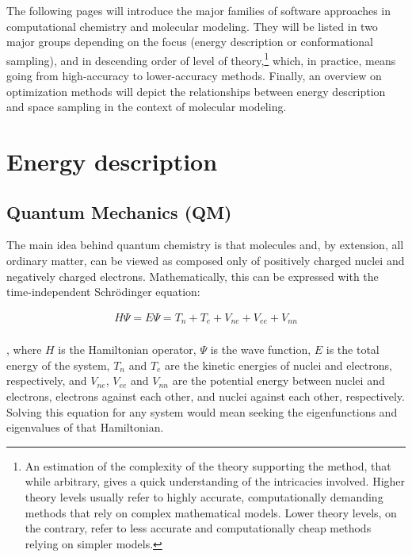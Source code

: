 The following pages will introduce the major families of software approaches in computational chemistry and molecular modeling. They will be listed in two major groups depending on the focus (energy description or conformational sampling), and in descending order of level of theory,\footnote{An estimation of the complexity of the theory supporting the method, that while arbitrary, gives a quick understanding of the intricacies involved. Higher theory levels usually refer to highly accurate, computationally demanding methods that rely on complex mathematical models. Lower theory levels, on the contrary, refer to less accurate and computationally cheap methods relying on simpler models.} which, in practice, means going from high-accuracy to lower-accuracy methods. Finally, an overview on optimization methods will depict the relationships between energy description and space sampling in the context of molecular modeling.


\section{Energy description}
\subsection{Quantum Mechanics (QM)}
\label{section:qm}

The main idea behind quantum chemistry is that molecules and, by extension, all ordinary matter, can be viewed as composed only of positively charged nuclei and negatively charged electrons. Mathematically, this can be expressed with the time-independent Schrödinger equation:

\begin{align}
	H \Psi =E \Psi =T_{n}+T_{e}+V_{ne}+V_{ee}+V_{nn} \\ \tag{Time-independent Schrödinger's equation}
\end{align}

, where $H$ is the Hamiltonian operator, $\Psi$ is the wave function, $E$ is the total energy of the system, $T_{n}$ and $T_{e}$ are the kinetic energies of nuclei and electrons, respectively, and $V_{ne}$, $V_{ee}$ and $V_{nn}$ are the potential energy between nuclei and electrons, electrons against each other, and nuclei against each other, respectively. Solving this equation for any system would mean seeking the eigenfunctions and eigenvalues of that Hamiltonian.

